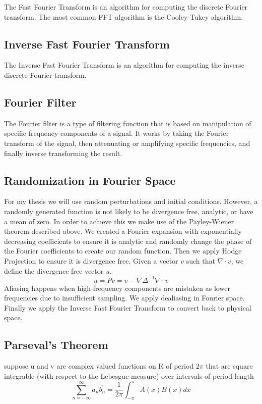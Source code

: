 \documentclass[12pt]{article}
\begin{document}
\begin{flushleft}
The Fast Fourier Transform is an algorithm for computing the discrete Fourier transform. The most common FFT algorithm is the Cooley-Tukey algorithm.

\subsection{Inverse Fast Fourier Transform}

The Inverse Fast Fourier Transform is an algorithm for computing the inverse discrete Fourier transform.

\subsection{Fourier Filter}

\qquad The Fourier filter is a type of filtering function that is based on manipulation of specific frequency components of a signal. It works by taking the Fourier transform of the signal, then attenuating or amplifying specific frequencies, and finally inverse transforming the result.

\subsection{Randomization in Fourier Space}

\qquad For my thesis we will use random perturbations and initial conditions. However, a randomly generated function is not likely to be divergence free, analytic, or have a mean of zero. In order to achieve this we make use of the Payley-Wiener theorem described above. We created a Fourier expansion with exponentially decreasing coefficients to ensure it is analytic and randomly change the phase of the Fourier coefficients to create our random function. Then we apply Hodge Projection to ensure it is divergence free. Given a vector $v$ such that $\nabla\cdot v$, we define the divergence free vector $u$,
$$u = Pv = v-\nabla\Delta^{-1}\nabla\cdot v$$
Aliasing happens when high-frequency components are mistaken as lower frequencies due to insufficient sampling. We apply dealiasing in Fourier space. Finally we apply the Inverse Fast Fourier Transform to convert back to physical space.

\subsection{Parseval's Theorem}

suppose u and v are complex valued functions on R of period $2\pi$ that are square integrable (with respect to the Lebesgue measure) over intervals of period length
$$\sum_{n=-\infty}^{\infty}a_n\overline{b_n} = \frac{1}{2\pi}\int_{-\pi}^{\pi}A(x)\overline{B(x)}dx$$


\end{flushleft}
\end{document}

